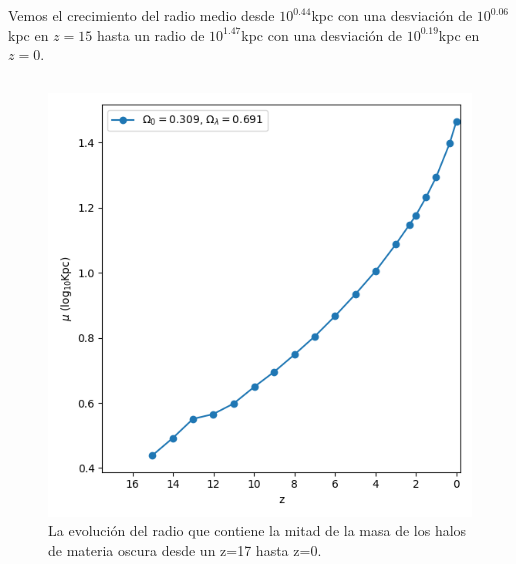 \documentclass{beamer}
\begin{document}
	\begin{frame}
		\small Vemos el crecimiento del radio medio desde $10^{0.44}$kpc con una desviación de $10^{0.06}$kpc en $z=15$ hasta un radio de $10^{1.47}$kpc con una desviación de $10^{0.19}$kpc en $z=0$.
		
		\begin{columns}[t]
			\begin{column}{.5\textwidth}
				\begin{figure}
					\centering
					\includegraphics[scale=0.3]{RunCanonica/HalfMassRad_Mean_RunCanonica.png}
					\caption{\footnotesize La evolución del radio que contiene la mitad de la masa de los halos de materia oscura desde un z=17 hasta z=0.}
					\label{fig:Canon-HalfMassRadMean}
				\end{figure}
			\end{column}


\end{columns}
\end{frame}
\end{document}
